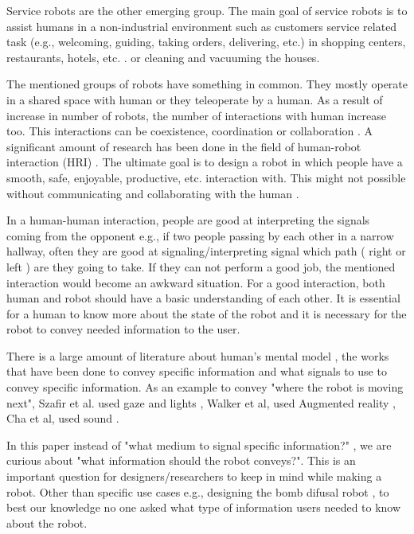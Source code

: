 \documentclass[letterpaper, 10 pt, conference]{ieeeconf}  %
\begin{document}
Service robots are the other emerging group. The main goal of service robots is to assist humans in a non-industrial environment such as customers service related task (e.g., welcoming, guiding, taking orders, delivering, etc.) in shopping centers, restaurants, hotels, etc. \cite{acosta2006design, datta2011pilot, kanda2009affective, osawa2017real, zalama2014sacarino}. or cleaning and vacuuming the houses\cite{forlizzi2006service}.


The mentioned groups of robots have something in common. They mostly operate in a shared space with human or they teleoperate by a human. As a result of increase in number of robots, the number of interactions with human increase too. This interactions can be coexistence, coordination or collaboration \cite{cha2018survey}. A significant amount of research has been done in the field of human-robot interaction (HRI) \cite{goodrich2008human}. The ultimate goal is to design a robot in which people have a smooth, safe, enjoyable, productive, etc. interaction with. This might not possible without communicating and collaborating with the human \cite{cha2018survey, khatib1999robots}. 

In a human-human interaction, people are good at interpreting the signals coming from the opponent e.g., if two people passing by each other in a narrow hallway, often they are good at signaling/interpreting signal which path ( right or left ) are they going to take. If they can not perform a good job, the mentioned interaction would become an awkward situation. For a good interaction, both human and robot should have a basic understanding of each other. It is essential for a human to know more about the state of the robot and it is necessary for the robot to convey needed information to the user.

There is a large amount of literature about human's mental model \cite{aggarwal2011human}, the works that have been done to convey specific information \cite{ arras2005we, bauer2008human} and what signals to use to convey specific information\cite{cha2018survey}. As an example to convey "where the robot is moving next", Szafir et al. used gaze and lights \cite{szafir2015communicating}, Walker et al, used Augmented reality \cite{walker2018communicating}, Cha et al, used sound \cite{cha2018effects}. 

In this paper instead of "what medium to signal specific information?" , we are curious about "what information should the robot conveys?". This is an important question for designers/researchers to keep in mind while making a robot. Other than specific use cases e.g., designing the bomb difusal robot \cite{adams2005human}, to best our knowledge no one asked what type of information users needed to know about the robot.
\end{document}
